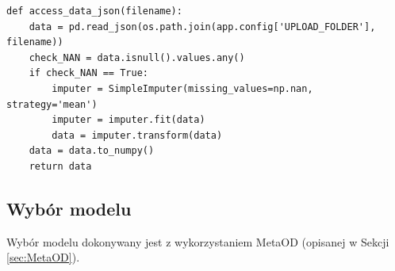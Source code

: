 \lstset{language=Python}
\lstset{frame=lines}
\lstset{basicstyle=\footnotesize}
\begin{lstlisting}
def access_data_json(filename):
    data = pd.read_json(os.path.join(app.config['UPLOAD_FOLDER'], filename))
    check_NAN = data.isnull().values.any()
    if check_NAN == True:
        imputer = SimpleImputer(missing_values=np.nan, strategy='mean')
        imputer = imputer.fit(data)
        data = imputer.transform(data)
    data = data.to_numpy()
    return data
\end{lstlisting}
\subsection{Wybór modelu}
Wybór modelu dokonywany jest z wykorzystaniem MetaOD (opisanej w Sekcji \ref{sec:MetaOD}). 
\lstset{language=Python}
\lstset{frame=lines}
\lstset{basicstyle=\footnotesize}
\label{cont}

